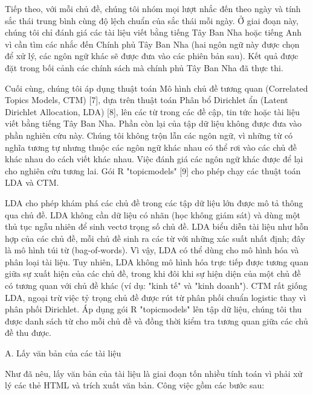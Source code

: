 Tiếp theo, với mỗi chủ đề, chúng tôi nhóm mọi lượt nhắc đến theo ngày và tính sắc thái trung bình cùng độ lệch chuẩn của sắc thái mỗi ngày. Ở giai đoạn này, chúng tôi chỉ đánh giá các tài liệu viết bằng tiếng Tây Ban Nha hoặc tiếng Anh vì cần tìm các nhắc đến Chính phủ Tây Ban Nha (hai ngôn ngữ này được chọn để xử lý, các ngôn ngữ khác sẽ được đưa vào các phiên bản sau). Kết quả được đặt trong bối cảnh các chính sách mà chính phủ Tây Ban Nha đã thực thi.

Cuối cùng, chúng tôi áp dụng thuật toán Mô hình chủ đề tương quan (Correlated Topics Models, CTM) {[}7{]}, dựa trên thuật toán Phân bổ Dirichlet ẩn (Latent Dirichlet Allocation, LDA) {[}8{]}, lên các từ trong các đề cập, tin tức hoặc tài liệu viết bằng tiếng Tây Ban Nha. Phần còn lại của tập dữ liệu không được đưa vào phần nghiên cứu này. Chúng tôi không trộn lẫn các ngôn ngữ, vì những từ có nghĩa tương tự nhưng thuộc các ngôn ngữ khác nhau có thể rơi vào các chủ đề khác nhau do cách viết khác nhau. Việc đánh giá các ngôn ngữ khác được để lại cho nghiên cứu tương lai. Gói R "topicmodels" {[}9{]} cho phép chạy các thuật toán LDA và CTM.

LDA cho phép khám phá các chủ đề trong các tập dữ liệu lớn được mô tả thông qua chủ đề. LDA không cần dữ liệu có nhãn (học không giám sát) và dùng một thủ tục ngẫu nhiên để sinh vectơ trọng số chủ đề. LDA biểu diễn tài liệu như hỗn hợp của các chủ đề, mỗi chủ đề sinh ra các từ với những xác suất nhất định; đây là mô hình túi từ (bag-of-words). Vì vậy, LDA có thể dùng cho mô hình hóa và phân loại tài liệu. Tuy nhiên, LDA không mô hình hóa trực tiếp được tương quan giữa sự xuất hiện của các chủ đề, trong khi đôi khi sự hiện diện của một chủ đề có tương quan với chủ đề khác (ví dụ: "kinh tế" và "kinh doanh"). CTM rất giống LDA, ngoại trừ việc tỷ trọng chủ đề được rút từ phân phối chuẩn logistic thay vì phân phối Dirichlet. Áp dụng gói R "topicmodels" lên tập dữ liệu, chúng tôi thu được danh sách từ cho mỗi chủ đề và đồng thời kiểm tra tương quan giữa các chủ đề thu được.

A. Lấy văn bản của các tài liệu

Như đã nêu, lấy văn bản của tài liệu là giai đoạn tốn nhiều tính toán vì phải xử lý các thẻ HTML và trích xuất văn bản. Công việc gồm các bước sau:

